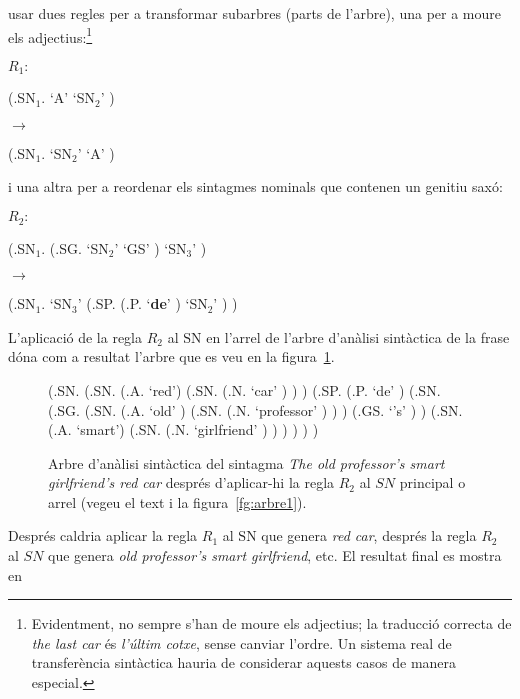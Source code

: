 usar dues regles per a transformar subarbres (parts de l'arbre), una
per a moure els adjectius:\footnote{Evidentment, no sempre s'han de
  moure els adjectius; la traducció correcta de \emph{the last car} és
  \emph{l'últim cotxe}, sense canviar l'ordre. Un sistema real de
  transferència sintàctica hauria de considerar aquests casos de
  manera especial.}
\begin{center}
 $R_1:$ \begin{parsetree} (.\textrm{SN}$_1$. `A' `SN$_2$' )
 \end{parsetree}
$\longrightarrow$ 
\begin{parsetree} (.SN$_1$.  `SN$_2$' `A' ) \end{parsetree}
\end{center}
i una altra per a reordenar els sintagmes nominals que contenen un
genitiu saxó:
\begin{center}
$R_2:$ \begin{parsetree} (.SN$_1$. (.SG.  `SN$_2$' `GS' ) `SN$_3$' )
\end{parsetree}
$\longrightarrow$
\begin{parsetree} (.SN$_1$. `SN$_3$' (.SP. (.P. `\textbf{de}' ) `SN$_2$'  )  )
\end{parsetree} 
\end{center}
L'aplicació de la regla $R_2$ al $\mathrm{SN}$ en l'arrel de l'arbre
d'anàlisi sintàctica de la frase dóna com a resultat l'arbre que es
veu en la figura~\ref{fg:arbre2}.
\begin{figure}
\begin{center}
\begin{parsetree}
(.SN. 
     (.SN. (.A. `red') (.SN. (.N. `car' ) ) ) 
     (.SP. 
            (.P. `de' )
            (.SN. (.SG. 
                   (.SN. (.A. `old' ) (.SN. (.N. `professor' ) )
                   )
                   (.GS. `{'s}' ) 
                  )
                  (.SN. (.A. `smart') (.SN. (.N. `girlfriend' ) ) )
            )
     )
)                  
\end{parsetree}
\end{center}
\caption{Arbre d'anàlisi sintàctica del sintagma \emph{The old
    professor's smart girlfriend's red car} després d'aplicar-hi la
  regla $R_2$ al $SN$ principal o arrel (vegeu el text i la
  figura~\protect\ref{fg:arbre1}).}
\label{fg:arbre2}
\end{figure}
Després caldria aplicar la regla $R_1$ al $\mathrm{SN}$ que genera
\emph{red car}, després la regla $R_2$ al $SN$ que genera \emph{old
  professor's smart girlfriend}, etc.  El resultat final es mostra en
